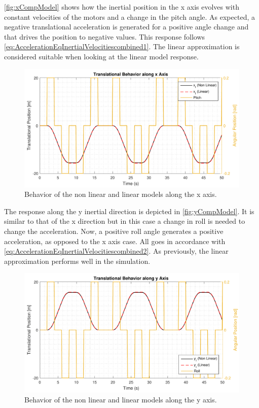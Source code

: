 \autoref{fig:xCompModel} shows how the inertial position in the x axis evolves with constant velocities of the motors and a change in the pitch angle. As expected, a negative translational acceleration is generated for a positive angle change and that drives the position to negative values. This response follows \autoref{eq:AccelerationEqInertialVelocitiescombined1}. The linear approximation is considered suitable when looking at the linear model response.
\begin{figure}[H]
	\centering
	\includegraphics[scale=0.65]{figures/xCompModel}
	\caption{Behavior of the non linear and linear models along the x axis.}
	\label{fig:xCompModel}
\end{figure}
The response along the y inertial direction is depicted in \autoref{fig:yCompModel}. It is similar to that of the x direction but in this case a change in roll is needed to change the acceleration. Now, a positive roll angle generates a positive acceleration, as opposed to the x axis case. All goes in accordance with \autoref{eq:AccelerationEqInertialVelocitiescombined2}. As previously, the linear approximation performs well in the simulation.
\begin{figure}[H]
	\centering
	\includegraphics[scale=0.65]{figures/yCompModel}
	\caption{Behavior of the non linear and linear models along the y axis.}
	\label{fig:yCompModel}
\end{figure}
